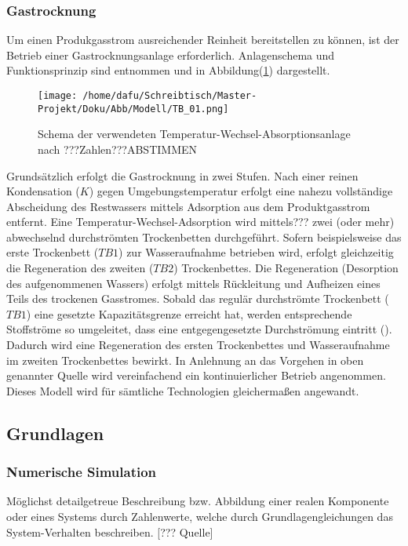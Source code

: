 \documentclass[onecolumn,10pt,titlepage]{article}
\begin{document}
\subsubsection{Gastrocknung}
\label{subsubs_peri_schem_Gastrockn}
Um einen Produkgasstrom ausreichender Reinheit bereitstellen zu können, ist der Betrieb einer Gastrocknungsanlage erforderlich. Anlagenschema und Funktionsprinzip sind \cite{Tjarks2017} entnommen und in Abbildung(\ref {fig:schema_TB}) dargestellt.

\begin{figure}[H]
	
	\centering

	\texttt{[image: /home/dafu/Schreibtisch/Master-Projekt/Doku/Abb/Modell/TB\_01.png]}
	\caption{Schema der verwendeten Temperatur-Wechsel-Absorptionsanlage nach \cite{Tjarks2017} ???Zahlen???ABSTIMMEN}
	\label{fig:schema_TB} 
\end{figure}
Grundsätzlich erfolgt die Gastrocknung in zwei Stufen. Nach einer reinen Kondensation ($K$) gegen Umgebungstemperatur erfolgt eine nahezu vollständige Abscheidung des Restwassers mittels Adsorption aus dem Produktgasstrom entfernt. 
Eine Temperatur-Wechsel-Adsorption wird mittels??? zwei (oder mehr) abwechselnd durchströmten Trockenbetten durchgeführt. Sofern beispielsweise das erste Trockenbett ($TB1$) zur Wasseraufnahme betrieben wird, erfolgt gleichzeitig die Regeneration des zweiten ($TB2$) Trockenbettes. Die Regeneration (Desorption des aufgenommenen Wassers) erfolgt mittels Rückleitung und Aufheizen eines Teils des trockenen Gasstromes. Sobald das regulär durchströmte Trockenbett ($TB1$) eine gesetzte Kapazitätsgrenze erreicht hat, werden entsprechende Stoffströme so umgeleitet, dass eine entgegengesetzte Durchströmung eintritt (). Dadurch wird eine Regeneration des ersten Trockenbettes und Wasseraufnahme im zweiten Trockenbettes bewirkt. 
In Anlehnung an das Vorgehen in oben genannter Quelle wird vereinfachend ein kontinuierlicher Betrieb angenommen.\\
Dieses Modell wird für sämtliche Technologien gleichermaßen angewandt.

\subsection{Grundlagen}
\subsubsection{Numerische Simulation}
Möglichst detailgetreue Beschreibung bzw. Abbildung einer realen Komponente oder eines Systems durch Zahlenwerte, welche durch Grundlagengleichungen das System-Verhalten beschreiben. [??? Quelle]
\end{document}
